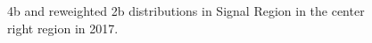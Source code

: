 \begin{figure}[ht]
 

    \caption{4b and reweighted 2b distributions in Signal Region in the center right region in 2017.}
    \label{fig:center-right-4b-SR-2017}
\end{figure}


